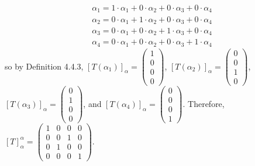\documentclass[12pt]{article}
\newenvironment{problem}[2][Problem]
{
	\begin{trivlist} 
		\item[\hskip \labelsep {\bfseries #1 #2:}]
	}
{
	\end{trivlist}
	}
\newenvironment{solution}[1][Solution]
{
	\begin{trivlist} 
		\item[\hskip \labelsep {\itshape #1:}]
	}
	{
	\end{trivlist}
}
\begin{document}
\begin{problem}{2}
\begin{solution}
\begin{align*}
\alpha_1 = 1\cdot \alpha_1 + 0\cdot \alpha_2 + 0\cdot \alpha_3 + 0\cdot \alpha_4\\
\alpha_2 = 0\cdot \alpha_1 + 1\cdot \alpha_2 + 0\cdot \alpha_3 + 0\cdot \alpha_4\\
\alpha_3 = 0\cdot \alpha_1 + 0\cdot \alpha_2 + 1\cdot \alpha_3 + 0\cdot \alpha_4\\
\alpha_4 = 0\cdot \alpha_1 + 0\cdot \alpha_2 + 0\cdot \alpha_3 + 1\cdot \alpha_4
\end{align*} so by Definition 4.4.3,
$[T(\alpha_1)]_{\alpha} = \begin{pmatrix} 1\\0\\0\\0 \end{pmatrix}$,
$[T(\alpha_2)]_{\alpha} = \begin{pmatrix} 0\\0\\1\\0 \end{pmatrix}$,
$[T(\alpha_3)]_{\alpha} = \begin{pmatrix} 0\\1\\0\\0 \end{pmatrix}$, and
$[T(\alpha_4)]_{\alpha} = \begin{pmatrix} 0\\0\\0\\1 \end{pmatrix}$.
Therefore, $[T]^\alpha _\alpha = \begin{pmatrix} 1&0&0&0\\0&0&1&0\\0&1&0&0\\0&0&0&1 \end{pmatrix}$.
\end{solution}
\end{problem}
\end{document}
